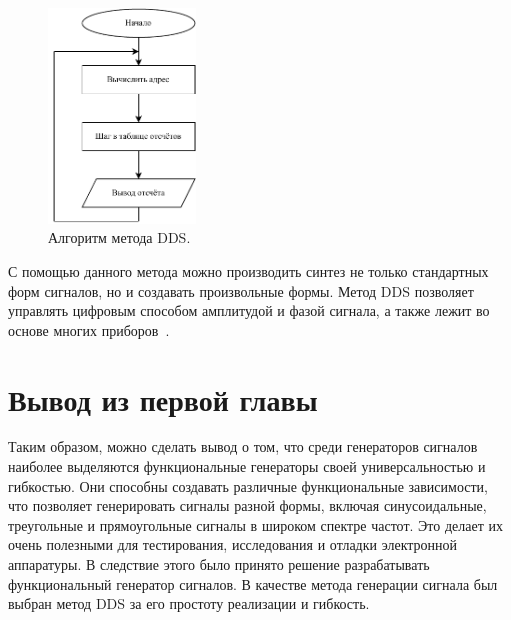 	\begin{figure}[H]
    \centering
    \includegraphics[width=0.35\textwidth]{../image/dds_block.pdf}
    \caption{Алгоритм метода DDS.}
	\end{figure}
	
	С помощью данного метода можно производить синтез не только стандартных форм сигналов, но и создавать произвольные формы. Метод DDS позволяет управлять цифровым способом амплитудой и фазой сигнала, а также лежит во основе многих приборов~\cite{dds_en}.
	
\section{Вывод из первой главы}
	Таким образом, можно сделать вывод о том, что среди генераторов сигналов наиболее  выделяются функциональные генераторы своей универсальностью и гибкостью. Они способны создавать различные функциональные зависимости, что позволяет генерировать сигналы разной формы, включая синусоидальные, треугольные и прямоугольные сигналы в широком спектре частот. Это делает их очень полезными для тестирования, исследования и отладки электронной аппаратуры. В следствие этого было принято решение разрабатывать функциональный генератор сигналов. В качестве метода генерации сигнала был выбран метод DDS за его простоту реализации и гибкость.
	
	
